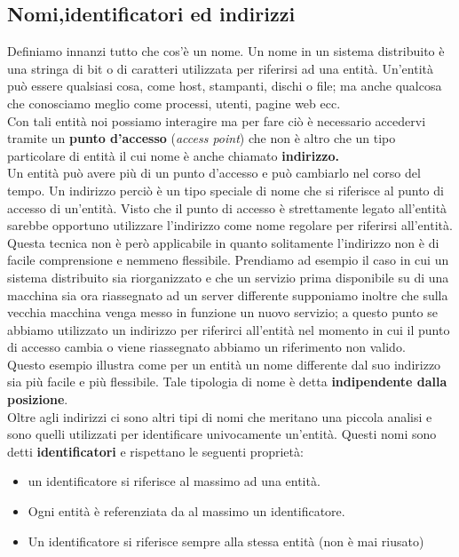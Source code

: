 \subsection{Nomi,identificatori ed indirizzi}
Definiamo innanzi tutto che cos'è un nome. Un nome in un sistema distribuito è una stringa di bit o di caratteri utilizzata per riferirsi ad una entità. Un'entità può essere qualsiasi cosa, come host, stampanti, dischi o file; ma anche qualcosa che conosciamo meglio come processi, utenti, pagine web ecc.\\
Con tali entità noi possiamo interagire ma per fare ciò è necessario accedervi tramite un \textbf{punto d'accesso} (\emph{access point}) che non è altro che un tipo particolare di entità il cui nome è anche chiamato \textbf{indirizzo.}\\
Un entità può avere più di un punto d'accesso e può cambiarlo nel corso del tempo. Un indirizzo perciò è un tipo speciale di nome che si riferisce al punto di accesso di un'entità. Visto che il punto di accesso è strettamente legato all'entità sarebbe opportuno utilizzare l'indirizzo come nome regolare per riferirsi all'entità. Questa tecnica non è però applicabile in quanto solitamente l'indirizzo non è di facile comprensione e nemmeno flessibile. Prendiamo ad esempio il caso in cui un sistema distribuito sia riorganizzato e che un servizio prima disponibile su di una macchina sia ora riassegnato ad un server differente supponiamo inoltre che sulla vecchia macchina venga messo in funzione un nuovo servizio; a questo punto se abbiamo utilizzato un indirizzo per riferirci all'entità nel momento in cui il punto di accesso cambia o viene riassegnato abbiamo un riferimento non valido.\\
Questo esempio illustra come per un entità un nome differente dal suo indirizzo sia più facile e più flessibile. Tale tipologia di nome è detta \textbf{indipendente dalla posizione}.\\
Oltre agli indirizzi ci sono altri tipi di nomi che meritano una piccola analisi e sono quelli utilizzati per identificare univocamente un'entità. Questi nomi sono detti \textbf{identificatori} e rispettano le seguenti proprietà:
\begin{itemize}
\item un identificatore si riferisce al massimo ad una entità.
\item Ogni entità è referenziata da al massimo un identificatore.
\item Un identificatore si riferisce sempre alla stessa entità (non è mai riusato)
\end{itemize}
